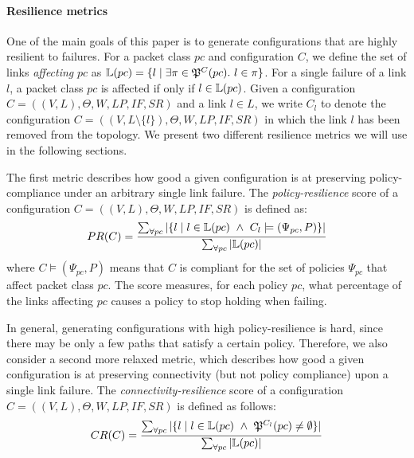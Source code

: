 \paragraph{Resilience metrics}
One of the main goals of this paper is to 
generate configurations that are highly resilient to failures.
For a packet class $pc$ and configuration $C$, we define 
the set of links \emph{affecting} $pc$ as 
$\mathbb{L}(pc) = \{l \mid \exists \pi \in \mathfrak{P}^C(pc).~l \in \pi  \}$.
For a single failure of a link $l$, a packet class $pc$ is affected 
if only if $l \in \mathbb{L}(pc)$. 
Given a configuration
$C=((V,L), \Theta,W,LP,IF,SR)$ and a link $l\in L$,
we write $C_l$ 
to denote the configuration
$C=((V,L\setminus\{l\}), \Theta,W,LP,IF,SR)$
in which the link $l$ has been removed from the topology.
We present two different resilience metrics we will use in the following sections. 


The first metric describes how good a given configuration
is at preserving policy-compliance under an 
arbitrary single link failure. 
The \emph{policy-resilience} score of a configuration 
$C=((V,L), \Theta,W,LP,IF,SR)$
is defined as:
\[
PR(C)=\frac{\sum_{\forall pc} |\{ l \mid l \in \mathbb{L}(pc) ~\wedge~ C_l \models (\Psi_{pc}, P) \}|}
{\sum_{\forall pc} |\mathbb{L}(pc)|}
\]
where $C \models (\Psi_{pc}, P)$ means that $C$ is 
compliant for the set of policies $\Psi_{pc}$ that affect packet class $pc$.
The score measures, for each policy $pc$, what percentage of the links affecting $pc$
causes a policy to stop holding when failing.

In general, generating configurations with high policy-resilience is hard,
since there may be only a few paths that satisfy a certain policy.
Therefore, we also consider a second 
more relaxed metric, which describes how 
good a given configuration
is at preserving connectivity
(but not policy compliance) upon a single link failure. 
The \emph{connectivity-resilience} 
score of a configuration $C=((V,L), \Theta,W,LP,IF,SR)$
is defined as follows:
\[
CR(C)=\frac{\sum_{\forall pc} |\{ l \mid l \in \mathbb{L}(pc) ~\wedge~\mathfrak{P}^{C_l }(pc) \not= \emptyset  \}|}
{\sum_{\forall pc} |\mathbb{L}(pc)|}
\]
 


